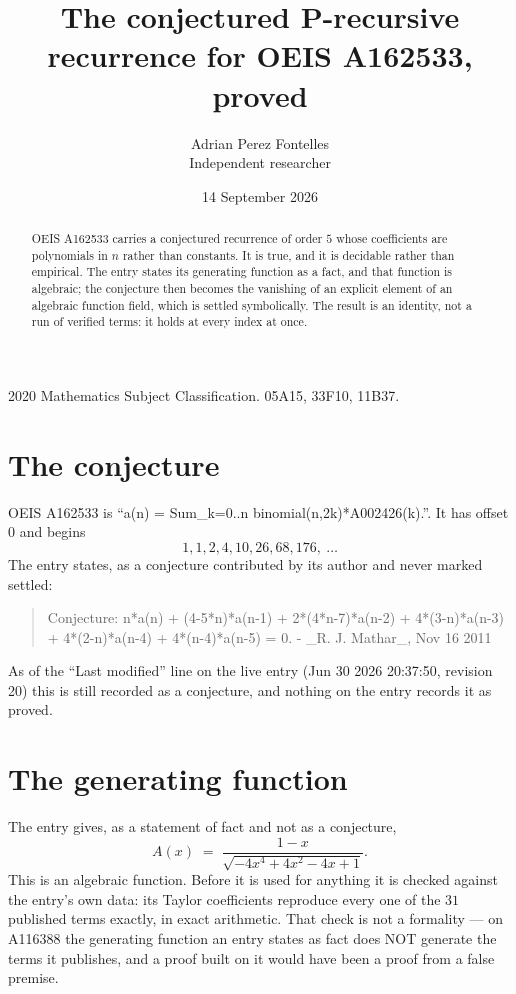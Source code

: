 \documentclass[11pt,a4paper]{article}
\title{The conjectured P-recursive recurrence for OEIS A162533, proved}
\author{Adrian Perez Fontelles\\ \small Independent researcher}
\date{14 September 2026}
\theoremstyle{plain}
\theoremstyle{definition}
\begin{document}
\maketitle

\begin{abstract}
OEIS A162533 carries a conjectured recurrence of order $5$ whose coefficients are polynomials in
$n$ rather than constants. It is true, and it is decidable rather than empirical. The entry
states its generating function as a fact, and that function is algebraic; the conjecture then
becomes the vanishing of an explicit element of an algebraic function field, which is settled
symbolically. The result is an identity, not a run of verified terms: it holds at every index
at once.
\end{abstract}

\noindent\small 2020 Mathematics Subject Classification. 05A15, 33F10, 11B37.\normalsize

\section{The conjecture}

OEIS A162533 is ``a(n) = Sum\_{k=0..n} binomial(n,2k)*A002426(k).''. It has offset $0$ and begins
\[
1, 1, 2, 4, 10, 26, 68, 176,\ \dots
\]
The entry states, as a conjecture contributed by its author and never marked settled:
\begin{quote}\raggedright\small
Conjecture: n*a(n) + (4-5*n)*a(n-1) + 2*(4*n-7)*a(n-2) + 4*(3-n)*a(n-3) + 4*(2-n)*a(n-4) + 4*(n-4)*a(n-5) = 0. - \_R. J. Mathar\_, Nov 16 2011
\end{quote}
As of the ``Last modified'' line on the live entry (Jun 30 2026 20:37:50, revision 20)
this is still recorded as a conjecture, and nothing on the entry records it as proved.

\section{The generating function}

The entry gives, as a statement of fact and not as a conjecture,
\[
A(x)\;=\;\frac{1 - x}{\sqrt{- 4 x^{4} + 4 x^{2} - 4 x + 1}} .
\]
This is an algebraic function. Before it is used for anything it is checked against the entry's
own data: its Taylor coefficients reproduce every one of the $31$ published terms
exactly, in exact arithmetic. That check is not a formality --- on A116388 the generating
function an entry states as fact does NOT generate the terms it publishes, and a proof built on
it would have been a proof from a false premise.
\end{document}
